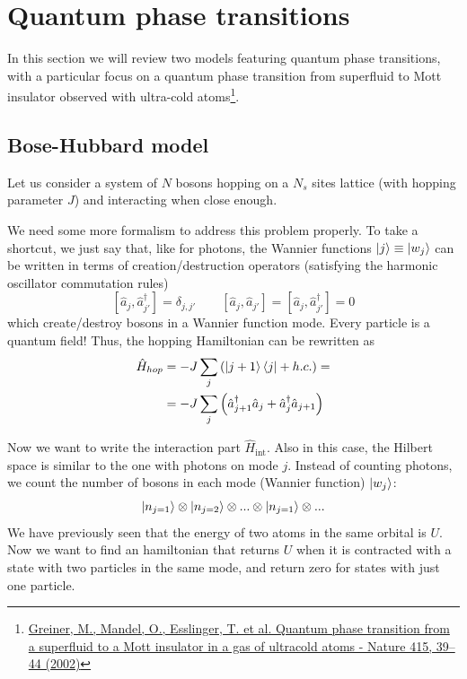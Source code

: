 
\section{Quantum phase transitions}

In this section we will review two models featuring quantum phase transitions, with a particular focus on a quantum phase transition from superfluid to Mott insulator observed with ultra-cold atoms\footnote{\href{https://www.nature.com/articles/415039aa}{Greiner, M., Mandel, O., Esslinger, T. et al. Quantum phase transition from a superfluid to a Mott insulator in a gas of ultracold atoms - Nature 415, 39–44 (2002)}}.





\subsection{Bose-Hubbard model}

Let us consider a system of $N$ bosons hopping on a $N_s$ sites lattice (with hopping parameter $J$) and interacting when close enough.

We need some more formalism to address this problem properly. To take a shortcut, we just say that, like for photons, the Wannier functions $\ket{j}\equiv\ket{w_j}$ can be written in terms of creation/destruction operators (satisfying the harmonic oscillator commutation rules)
$$ \left[\hat{a}_j, \hat{a}_{j'}^\dag\right] = \delta_{j,j'}
   \qquad
   \left[\hat{a}_j, \hat{a}_{j'}\right] =
   \left[\hat{a}_j, \hat{a}_{j'}^\dag\right] = 0
$$
which create/destroy bosons in a Wannier function mode. Every particle is a quantum field! Thus, the hopping Hamiltonian can be rewritten as
\begin{align*}
\hat{H}_{hop} &= -J\sum_j
    \left( \ket{j+1}\bra{j} + h.c. \right) =\\
&= -J\sum_j
    \left( \hat{a}_{j+1}^\dag\hat{a}_{j} + \hat{a}_{j}^\dag\hat{a}_{j+1} \right)
\end{align*}

Now we want to write the interaction part $\hat{H}_{\text{int}}$. Also in this case, the Hilbert space is similar to the one with photons on mode $j$. Instead of counting photons, we count the number of bosons in each mode (Wannier function) $\ket{w_j}$:
\begin{equation*}
    \ket{n_{j=1}} \otimes \ket{n_{j=2}} \otimes ... \otimes \ket{n_{j=1}} \otimes ...
\end{equation*}
We have previously seen that the energy of two atoms in the same orbital is $U$. Now we want to find an hamiltonian that returns $U$ when it is contracted with a state with two particles in the same mode, and return zero for states with just one particle.

